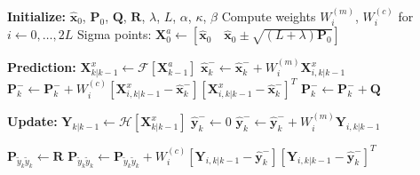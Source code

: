 \begin{algorithm}[H]
\caption{Unscented Kalman Filter Algorithm}
\label{alg:ukf}
\begin{algorithmic}[1]
    \vspace{0.6em}
    \State \textbf{Initialize:} $\hat{\mathbf{x}}_0$, $\mathbf{P}_0$, $\mathbf{Q}$, $\mathbf{R}$, $\lambda$, $L$, $\alpha$, $\kappa$, $\beta$
    \vspace{0.6em}
    \State Compute weights $W^{(m)}_i$, $W^{(c)}_i$ for $i \gets 0, \dots, 2L$
    \vspace{0.6em}
    \State Sigma points: $\mathbf{X}^a_{0} \gets \left[\hat{\mathbf{x}}_{0} \quad \hat{\mathbf{x}}_{0} \pm \sqrt{(L+\lambda)\mathbf{P}_{0}}\right]$
    \vspace{1em}

    \State \textbf{Prediction:}
    \vspace{0.6em}
    \State $\mathbf{X}^x_{k|k-1} \gets \mathcal{F}\left[\mathbf{X}^a_{k-1}\right]$
    \vspace{0.6em}
        \vspace{0.3em}
        \State $\hat{\mathbf{x}}^-_k \gets \hat{\mathbf{x}}^-_k + W^{(m)}_i \mathbf{X}^x_{i,k|k-1}$
        \vspace{0.3em}
    \EndFor
    \vspace{0.6em}
        \vspace{0.3em}
        \State $\mathbf{P}^-_k \gets \mathbf{P}^-_k + W^{(c)}_i \left[\mathbf{X}^x_{i,k|k-1} - \hat{\mathbf{x}}^-_k\right]\left[\mathbf{X}^x_{i,k|k-1} - \hat{\mathbf{x}}^-_k\right]^T$
        \vspace{0.3em}
    \EndFor
    \vspace{0.6em}
    \State $\mathbf{P}^-_k \gets \mathbf{P}^-_k + \mathbf{Q}$
    
    \vspace{1em}
    \State \textbf{Update:}
    \vspace{0.6em}
    \State $\mathbf{Y}_{k|k-1} \gets \mathcal{H}\left[\mathbf{X}^x_{k|k-1}\right]$
    \vspace{0.6em}
    \State $\hat{\mathbf{y}}^-_k \gets 0$
        \vspace{0.3em}
        \State $\hat{\mathbf{y}}^-_k \gets \hat{\mathbf{y}}^-_k + W^{(m)}_i \mathbf{Y}_{i,k|k-1}$
        \vspace{0.3em}
    \EndFor
    
    \vspace{0.6em}
    \State $\mathbf{P}_{\tilde{y}_k\tilde{y}_k} \gets \mathbf{R}$
        \vspace{0.3em}
        \State $\mathbf{P}_{\tilde{y}_k\tilde{y}_k} \gets \mathbf{P}_{\tilde{y}_k\tilde{y}_k} + W^{(c)}_i \left[\mathbf{Y}_{i,k|k-1} - \hat{\mathbf{y}}^-_k\right]\left[\mathbf{Y}_{i,k|k-1} - \hat{\mathbf{y}}^-_k\right]^T$
        \vspace{0.3em}
    \EndFor
    

\end{algorithmic}
\end{algorithm}

